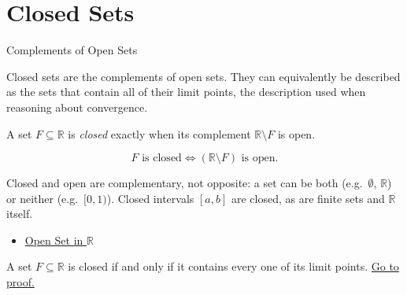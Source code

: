 \section{Closed Sets}
\label{sec:closed-sets}

\begin{topicbox}{Complements of Open Sets}
\begin{exposition}
Closed sets are the complements of open sets. They can equivalently be described as the sets that contain all of their limit points, the description used when reasoning about convergence.
\end{exposition}
\end{topicbox}
\begin{tcolorbox}[colback=defbox, colframe=defborder, arc=2pt,
  left=6pt, right=6pt, top=4pt, bottom=4pt,
  title={\small\textbf{Definition (Closed Set in $\mathbb{R}$)}},
  fonttitle=\small\bfseries]
\begin{definition}
\label{def:closed-set}
A set $F\subseteq\mathbb{R}$ is \emph{closed} exactly when its complement $\mathbb{R}\setminus F$ is open.
\end{definition}
\end{tcolorbox}
\begin{remark*}
\[
F \text{ is closed} \Longleftrightarrow (\mathbb{R}\setminus F) \text{ is open}.
\]
\end{remark*}
\begin{remark*}[Interpretation]
Closed and open are complementary, not opposite: a set can be both (e.g.\ $\emptyset$, $\mathbb{R}$) or neither (e.g.\ $[0,1)$). Closed intervals $[a,b]$ are closed, as are finite sets and $\mathbb{R}$ itself.
\end{remark*}
\begin{dependencies}
\begin{itemize}
  \item \hyperref[def:open-set]{Open Set in $\mathbb{R}$}
\end{itemize}
\end{dependencies}
\begin{tcolorbox}[colback=thmbox, colframe=thmborder, arc=2pt,
  left=6pt, right=6pt, top=4pt, bottom=4pt,
  title={\small\textbf{Theorem (Closed Sets Contain Their Limit Points)}},
  fonttitle=\small\bfseries]
\begin{theorem}
\label{thm:closed-iff-contains-limit-points}
A set $F\subseteq\mathbb{R}$ is closed if and only if it contains every one of its limit points.
\hyperref[prf:closed-iff-contains-limit-points]{Go to proof.}
\end{theorem}
\end{tcolorbox}
